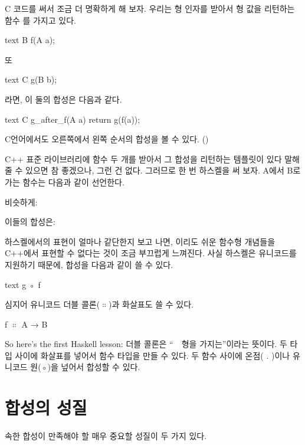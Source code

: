 C 코드를 써서 조금 더 명확하게 해 보자. 
우리는 형 인자를 받아서 형 값을 리턴하는 함수 를 가지고 있다.

\begin{snip}{text}
B f(A a);
\end{snip}
또

\begin{snip}{text}
C g(B b);
\end{snip}
라면, 이 둘의 합성은 다음과 같다.

\begin{snip}{text}
C g_after_f(A a)
{
    return g(f(a));
}
\end{snip}
C언어에서도 오른쪽에서 왼쪽 순서의 합성을 볼 수 있다. ()

C++ 표준 라이브러리에 함수 두 개를 받아서 그 합성을 리턴하는 템플릿이 있다 말해줄 수 있으면 참 좋겠으나, 그런 건 없다.
그러므로 한 번 하스켈을 써 보자. A에서 B로 가는 함수는 다음과 같이 선언한다.

비슷하게:

이들의 합성은:

하스켈에서의 표현이 얼마나 같단한지 보고 나면, 이리도 쉬운 함수형 개념들을 C++에서 표현할 수 없다는 것이 조금 부끄럽게 느껴진다.
사실 하스켈은 유니코드를 지원하기 때문에, 합성을 다음과 같이 쓸 수 있다.
\begin{snip}{text}
g ◦ f
\end{snip}

심지어 유니코드 더블 콜론($\ensuremath{\Colon}$)과 화살표도 쓸 수 있다.
\begin{snipv}
f \ensuremath{\Colon} A → B
\end{snipv}
So here's the first Haskell lesson: 더블 콜론은 ``~~형을 가지는''이라는 뜻이다.
두 타입 사이에 화살표를 넣어서 함수 타입을 만들 수 있다.
두 함수 사이에 온점( . )이나 유니코드 원(◦)을 넢어서 합성할 수 있다.

\section{합성의 성질}

 속한 합성이 만족해야 할 매우 중요할 성질이 두 가지 있다.

